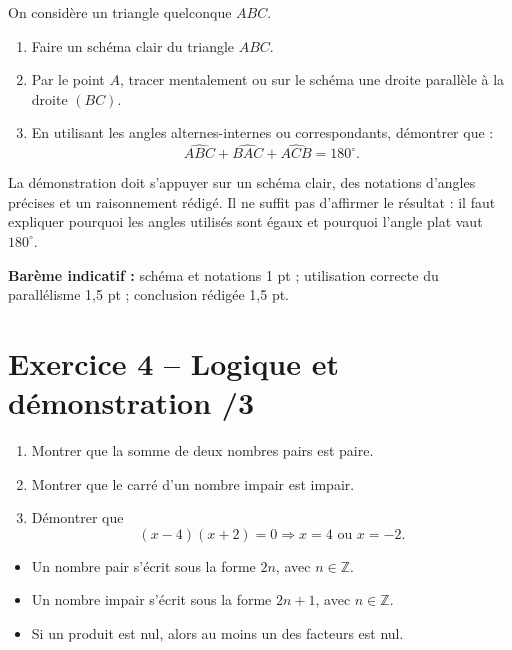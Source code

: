 \documentclass[11pt,a4paper]{article}
\begin{document}
On considère un triangle quelconque \(ABC\).

\begin{enumerate}[label=\textbf{\arabic*.}, leftmargin=1.2cm]
    \item Faire un schéma clair du triangle \(ABC\).
    \item Par le point \(A\), tracer mentalement ou sur le schéma une droite parallèle à la droite \((BC)\).
    \item En utilisant les angles alternes-internes ou correspondants, démontrer que :
    \[
    \widehat{ABC}+\widehat{BAC}+\widehat{ACB}=180^\circ.
    \]
\end{enumerate}

\begin{tcolorbox}[title=Attendus]
La démonstration doit s'appuyer sur un schéma clair, des notations d'angles précises et un raisonnement rédigé. Il ne suffit pas d'affirmer le résultat : il faut expliquer pourquoi les angles utilisés sont égaux et pourquoi l'angle plat vaut \(180^\circ\).
\end{tcolorbox}

\vspace{0.6em}
\textbf{Barème indicatif :} schéma et notations 1 pt ; utilisation correcte du parallélisme 1,5 pt ; conclusion rédigée 1,5 pt.

\section*{Exercice 4 -- Logique et démonstration \hfill /3}

\begin{enumerate}[label=\textbf{\arabic*.}, leftmargin=1.2cm]
    \item Montrer que la somme de deux nombres pairs est paire.
    \item Montrer que le carré d'un nombre impair est impair.
    \item Démontrer que
    \[
    (x-4)(x+2)=0 \Longrightarrow x=4 \text{ ou } x=-2.
    \]
\end{enumerate}

\begin{tcolorbox}[title=Rappels utiles]
\begin{itemize}[leftmargin=1.2cm]
    \item Un nombre pair s'écrit sous la forme \(2n\), avec \(n\in\mathbb{Z}\).
    \item Un nombre impair s'écrit sous la forme \(2n+1\), avec \(n\in\mathbb{Z}\).
    \item Si un produit est nul, alors au moins un des facteurs est nul.
\end{itemize}
\end{tcolorbox}
\end{document}
